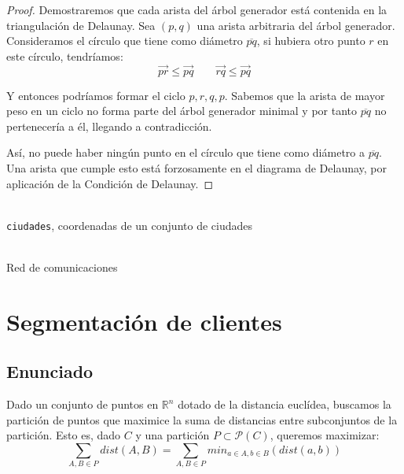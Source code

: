 \documentclass[a4paper, 11pt]{article} %
\begin{document}
    \begin{proof}
      Demostraremos que cada arista del árbol generador está contenida en la triangulación de Delaunay.
      Sea $(p,q)$ una arista arbitraria del árbol generador. 
      Consideramos el círculo que tiene como diámetro $\overline{pq}$, si hubiera otro punto $r$ en este círculo, tendríamos:
      \begin{equation}
       \overrightarrow{pr} \leq \overrightarrow{pq} \qquad \overrightarrow{rq} \leq \overrightarrow{pq}
      \end{equation}

      Y entonces podríamos formar el ciclo $p,r,q,p$. Sabemos que la arista de mayor peso en un ciclo no forma parte del árbol generador minimal y por tanto $\overline{pq}$
      no pertenecería a él, llegando a contradicción.

      Así, no puede haber ningún punto en el círculo que tiene como diámetro a $\overline{pq}$. Una arista que cumple esto está forzosamente en el diagrama de Delaunay,
      por aplicación de la Condición de Delaunay.
    \end{proof}
    
    
    \begin{algorithm}[H]
	\begin{algorithmic}[1]
		\REQUIRE \ \\
        	\texttt{ciudades}, coordenadas de un conjunto de ciudades \\\
		\RETURN{$Kruskal(\texttt{grafo})$}
	\end{algorithmic}
      \caption{Red de comunicaciones}
      \label{red}
    \end{algorithm}
    
\section{Segmentación de clientes}
  \subsection{Enunciado}
    Dado un conjunto de puntos en $\mathbb{R}^n$ dotado de la distancia euclídea, buscamos la partición de puntos que
    maximice la suma de distancias entre subconjuntos de la partición. Esto es, dado $C$ y una partición $P \subset \mathcal{P}(C)$,
    queremos maximizar:
    \begin{equation}
     \sum_{A,B \in P} dist(A,B) = \sum_{A,B \in P} min_{a\in A, b\in B}(dist(a,b))
    \end{equation}
\end{document}

